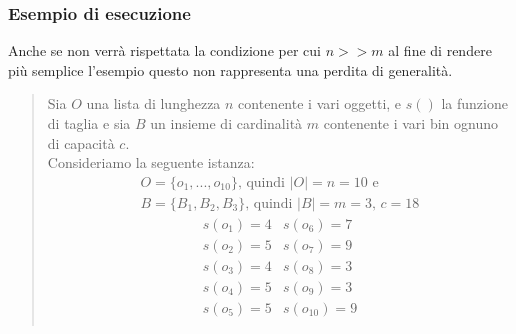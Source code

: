 \subsubsection{Esempio di esecuzione}
Anche se non verrà rispettata la condizione per cui $ n >> m $ al fine di rendere più semplice l'esempio questo non rappresenta una perdita di generalità.
\begin{quote}
	Sia $ O $ una lista di lunghezza $ n $ contenente i vari oggetti, e $ s() $
	la funzione di taglia e sia $ B $ un insieme di cardinalità $ m $ contenente i vari bin ognuno di capacità $ c $. \\
	Consideriamo la seguente istanza:
	\begin{equation*}
		\begin{array}{c}
			O = \{o_1, ..., o_{10}\} \text{, quindi } |O| = n = 10 \text{ e} \\
			B = \{B_1, B_2, B_3\} \text{, quindi } |B| = m = 3 \text{, } c = 18
	    \end{array}
	\end{equation*}
	\begin{equation*}
	    \begin{array}{cc}
			s(o_1) = 4	&	s(o_6) = 7   \\
			s(o_2) = 5	&	s(o_7) = 9  \\
			s(o_3) = 4	&	s(o_8) = 3   \\
			s(o_4) = 5	&	s(o_9) = 3   \\
			s(o_5) = 5	&	s(o_{10}) = 9 \\
		\end{array}
	\end{equation*}
	

\end{quote}
